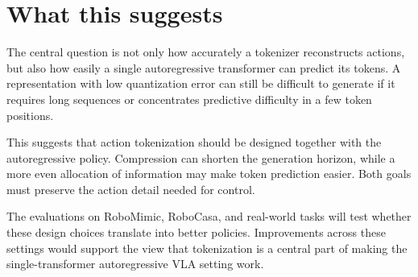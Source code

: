 \section{What this suggests}

The central question is not only how accurately a tokenizer reconstructs
actions, but also how easily a single autoregressive transformer can predict its
tokens. A representation with low quantization error can still be difficult to
generate if it requires long sequences or concentrates predictive difficulty in
a few token positions.

This suggests that action tokenization should be designed together with the
autoregressive policy. Compression can shorten the generation horizon, while a
more even allocation of information may make token prediction easier. Both goals
must preserve the action detail needed for control.

The evaluations on RoboMimic, RoboCasa, and real-world tasks will test whether
these design choices translate into better policies. Improvements across these
settings would support the view that tokenization is a central part of making
the single-transformer autoregressive VLA setting work.
